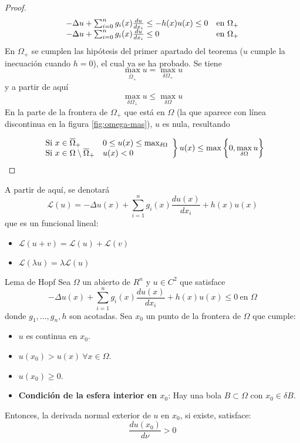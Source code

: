 \begin{proof}
\begin{equation*}
\begin{array}{l l}
-\Delta u + \sum_{i=0}^ng_i(x)\frac{du}{dx_i} \le -h(x)u(x) \le 0 & \text{en } \Omega_+\\
-\Delta u + \sum_{i=0}^ng_i(x)\frac{du}{dx_i} \le 0 & \text{en } \Omega_+\\
\end{array}
\end{equation*}
En $\Omega_+$ se cumplen las hipótesis del primer apartado del teorema ($u$ cumple la inecuación cuando $h=0$), el cual ya se ha probado. Se tiene
$$\max_{\overline{\Omega}_+}u = \max_{\delta\Omega_+}u$$
y a partir de aquí
$$\max_{\delta\Omega_+}u \le \max_{\delta\Omega}u $$
En la parte de la frontera de $\Omega_+$ que está en $\Omega$ (la que aparece con línea discontinua en la figura \ref{fig:omega-mas}), $u$ es nula, resultando

\begin{equation*}
\left.
\begin{array}{l l}
\text{Si } x\in\overline{\Omega}_+ & 0\le u(x)\le \max_{\delta\Omega}\\
\text{Si } x\in\Omega\setminus\overline{\Omega}_+ & u(x) < 0
\end{array}
\right\}
u(x) \le \max\left\{0, \max_{\delta\Omega} u\right\}
\end{equation*}
\end{proof}

\see
A partir de aquí, se denotará
$$\mathcal{L}(u) = -\Delta u(x) + \sum_{i=1}^n g_i(x)\frac{du(x)}{dx_i} + h(x)u(x)$$
que es un funcional lineal:
\begin{itemize}
\item $\mathcal{L}(u+v) = \mathcal{L}(u) + \mathcal{L}(v)$
\item $\mathcal{L}(\lambda u) = \lambda\mathcal{L}(u)$
\end{itemize}

\newpage
\begin{mathresult}{Lema de Hopf}
Sea $\Omega$ un abierto de $R^n$ y $u\in C^2$ que satisface
\begin{equation*}
-\Delta u(x) + \sum_{i=1}^n g_i(x)\frac{du(x)}{dx_i} + h(x)u(x) \le 0 \ \text{en } \Omega
\end{equation*}
donde $g_1,\hdots,g_n,h$ son acotadas.
Sea $x_0$ un punto de la frontera de $\Omega$ que cumple:
\begin{itemize}
\item $u$ es continua en $x_0$.
\item $u(x_0) > u(x)\ \forall x\in\Omega$.
\item $u(x_0) \ge 0$.
\item \textbf{Condición de la esfera interior en $x_0$}: Hay una bola $B\subset\Omega$ con $x_0\in\delta B$.
\end{itemize}
Entonces, la derivada normal exterior de $u$ en $x_0$, si existe, satisface:
\begin{equation}
\frac{du(x_0)}{d\nu} > 0
\end{equation}
\end{mathresult}


